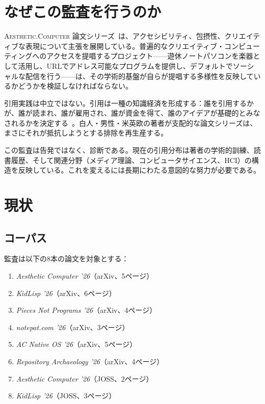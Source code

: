 \documentclass[10pt,letterpaper,twocolumn]{article}
\newcommand{\ac}{\textsc{Aesthetic.Computer}}
\begin{document}
\section{なぜこの監査を行うのか}

\ac{} 論文シリーズ~\citep{scudder2026ac, scudder2026kidlisp, scudder2026acos, scudder2026pieces, scudder2026notepat}は、アクセシビリティ、包摂性、クリエイティブな表現について主張を展開している。普遍的なクリエイティブ・コンピューティングへのアクセスを提唱するプロジェクト——遊休ノートパソコンを楽器として活用し、URLでアドレス可能なプログラムを提供し、デフォルトでソーシャルな配信を行う——は、その学術的基盤が自らが提唱する多様性を反映しているかどうかを検証しなければならない。

引用実践は中立ではない。引用は一種の知識経済を形成する：誰を引用するかが、誰が読まれ、誰が雇用され、誰が資金を得て、誰のアイデアが基礎的とみなされるかを決定する~\citep{benjamin2019race}。白人・男性・米英欧の著者が支配的な論文シリーズは、まさにそれが抵抗しようとする排除を再生産する。

この監査は告発ではなく、診断である。現在の引用分布は著者の学術的訓練、読書履歴、そして関連分野（メディア理論、コンピュータサイエンス、HCI）の構造を反映している。これを変えるには長期にわたる意図的な努力が必要である。


\section{現状}

\subsection{コーパス}

監査は以下の8本の論文を対象とする：

\begin{enumerate}
  \item \emph{Aesthetic Computer '26}（arXiv、5ページ）
  \item \emph{KidLisp '26}（arXiv、6ページ）
  \item \emph{Pieces Not Programs '26}（arXiv、4ページ）
  \item \emph{notepat.com '26}（arXiv、3ページ）
  \item \emph{AC Native OS '26}（arXiv、5ページ）
  \item \emph{Repository Archaeology '26}（arXiv、4ページ）
  \item \emph{Aesthetic Computer '26}（JOSS、2ページ）
  \item \emph{KidLisp '26}（JOSS、3ページ）
\end{enumerate}
\end{document}
